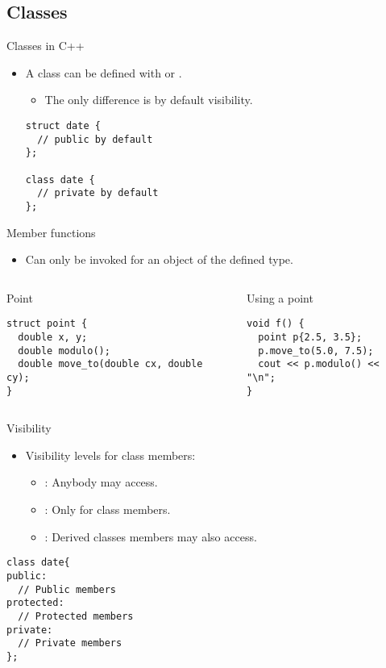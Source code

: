\subsection{Classes}

\begin{frame}[t,fragile]{Classes in C++}
\begin{itemize}
  \item A class can be defined with  or .
    \begin{itemize}
      \item The only difference is by default visibility.
    \end{itemize}
\begin{lstlisting}
struct date {
  // public by default
};

class date {
  // private by default
};
\end{lstlisting}
\end{itemize}
\end{frame}

\begin{frame}[t,fragile]{Member functions}
\begin{itemize}
  \item Can only be invoked for an object of the defined type.
\end{itemize}

\begin{columns}[T]

\begin{block}{Point}
\begin{lstlisting}
struct point {
  double x, y;
  double modulo();
  double move_to(double cx, double cy);
}
\end{lstlisting}
\end{block}

\begin{block}{Using a point}
\begin{lstlisting}
void f() {
  point p{2.5, 3.5};
  p.move_to(5.0, 7.5);
  cout << p.modulo() << "\n";
}
\end{lstlisting}
\end{block}
\end{columns}

\end{frame}

\begin{frame}[t,fragile]{Visibility}
\begin{itemize}
  \item Visibility levels for class members:
    \begin{itemize}
      \item {}: Anybody may access.
      \item {}: Only for class members.
      \item {}: Derived classes members may also access.
    \end{itemize}
\end{itemize}
\vfill
\begin{lstlisting}
class date{
public:
  // Public members
protected:
  // Protected members
private:
  // Private members
};
\end{lstlisting}
\end{frame}
